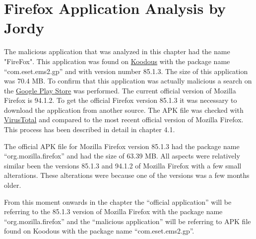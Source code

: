 \section{Firefox Application Analysis by Jordy}
The malicious application that was analyzed in this chapter had the name "FireFox". This application was found on \href{https://koodous.com/apks/26a7576cc1182bf90fb16c3320d12a736b3faa10c158755605f36daae4b197b7}{Koodous} with the package name “com.eset.ems2.gp” and with version number 85.1.3. The size of this application was 70.4 MB. To confirm that this application was actually malicious a search on the \href{https://play.google.com/store/apps/details?id=org.mozilla.firefox&hl=nl&gl=US}{Google Play Store} was performed. The current official version of Mozilla Firefox is 94.1.2. To get the official Firefox version 85.1.3 it was necessary to download the application from another source. The APK file was checked with \href{https://www.virustotal.com/gui/file/59ce0f9ea256b4576f391d01c685ced2db224a252bf09c3f362e6859a6c7ead5/details}{VirusTotal} and compared to the most recent official version of Mozilla Firefox. This process has been described in detail in chapter 4.1.

The official APK file for Mozilla Firefox version 85.1.3 had the package name “org.mozilla.firefox” and had the size of 63.39 MB. All aspects were relatively similar been the versions 85.1.3 and 94.1.2 of Mozilla Firefox with a few small alterations. These alterations were because one of the versions was a few months older. 

From this moment onwards in the chapter the “official application” will be referring to the 85.1.3 version of Mozilla Firefox with the package name “org.mozilla.firefox” and the “malicious application” will be referring to APK file found on Koodous with the package name “com.eset.ems2.gp”.